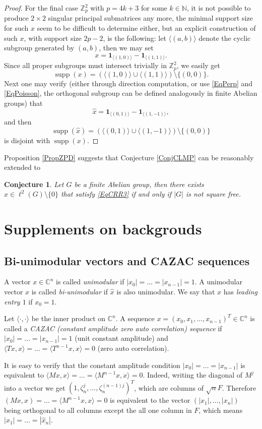 \documentclass[A4,11pt]{article}
\DeclareMathOperator{\supp}{supp}
\newcommand{\bra}[1]{\langle#1\rangle}
\newtheorem{Conj}{Conjecture}
\begin{document}
\begin{proof}
For the final case $\mathbb Z_p^2$ with $p=4k+3$ for some $k\in\mathbb N$, it is not possible to produce $2\times 2$ singular principal submatrices any more, the minimal support size for such $x$ seem to be difficult to determine either, but an explicit construction of such $x$, with support size $2p-2$, is the following: let $\bra{(a,b)}$ denote the cyclic subgroup generated by $(a,b)$, then we may set
$$x=\mathbf 1_{\bra{(1,0)}}-\mathbf 1_{\bra{(1,1)}}.$$
Since all proper subgroups must intersect trivially in $\mathbb Z_p^2$, we easily get
$$\supp(x)=\left(\bra{(1,0)}\cup\bra{(1,1)}\right)\setminus\{(0,0)\}.$$
Next one may verify (either through direction computation, or use \eqref{EqPerp} and \eqref{EqPoisson}, the orthogonal subgroup can be defined analogously in finite Abelian groups) that
$$\hat x=\mathbf 1_{\bra{(0,1)}}-\mathbf 1_{\bra{(1,-1)}},$$
and then
$$\supp(\hat x)=\left(\bra{(0,1)}\cup\bra{(1,-1)}\right)\setminus\{(0,0)\}$$
is disjoint with $\supp(x)$. 
\end{proof}

Proposition \ref{PropZPD} suggests that Conjecture \ref{ConjCLMP} can be reasonably extended to

\begin{Conj}
Let $G$ be a finite Abelian group, then there exists $x\in\ell^2(G)\setminus\{0\}$ that satisfy \eqref{EqCRR3} if and only if $|G|$ is not square free.
\end{Conj}

\section{Supplements on backgrouds} \label{SecRef}
\subsection{Bi-unimodular vectors and CAZAC sequences} 
A vector $x\in\mathbb C^n$ is called \emph{unimodular} if $|x_0|=\ldots=|x_{n-1}|=1$. A unimodular vector $x$ is called \emph{bi-unimodular} if $\hat x$ is also unimodular. We say that $x$ has \emph{leading entry $1$} if $x_0=1$.

Let $\bra{\cdot,\cdot}$ be the inner product on $\mathbb C^n$. A sequence $x=(x_0,x_1,\ldots,x_{n-1})^T\in\mathbb C^n$ is called a \emph{CAZAC (constant amplitude zero auto correlation) sequence} if $|x_0|=\ldots=|x_{n-1}|=1$ (unit constant amplitude) and $\bra{Tx,x}=\ldots=\bra{T^{n-1}x,x}=0$ (zero auto correlation). 

It is easy to verify that the constant amplitude condition $|x_0|=\ldots=|x_{n-1}|$ is equivalent to $\bra{Mx,x}=\ldots=\bra{M^{n-1}x,x}=0$. Indeed, writing the diagonal of $M^j$ into a vector we get $(1,\zeta_n^j,\ldots,\zeta_n^{(n-1)j})^T$, which are columns of $\sqrt nF$. Therefore $(Mx,x)=\dots=\bra{M^{n-1}x,x}=0$ is equivalent to the vector $(|x_1|,\ldots,|x_n|)$ being orthogonal to all columns except the all one column in $F$, which means $|x_1|=\ldots=|\hat x_n|$. 
\end{document}
